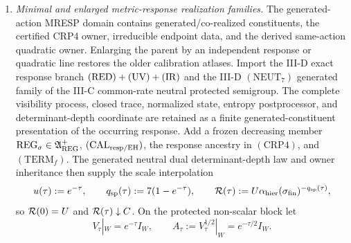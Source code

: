 \documentclass[12pt,a4paper]{article}
\begin{document}
\begin{definition}
\begin{enumerate}[label=(\roman*)]
\item \emph{Minimal and enlarged metric-response realization families.}
The generated-action MRESP domain contains generated/co-realized constituents,
the certified CRP4 owner, irreducible endpoint data, and the derived
same-action quadratic owner.  Enlarging the parent by an independent
response or quadratic line restores the older calibration atlases.
Import the III-D exact response branch
\((\mathrm{RED})+({\rm UV})+({\rm IR})\) and the III-D \((\mathrm{NEUT}_7)\)
generated family of the III-C common-rate neutral protected semigroup.  The
complete visibility process, closed trace, normalized state, entropy
postprocessor, and determinant-depth coordinate are retained as a finite
generated-constituent presentation of the occurring response.  Add a frozen
decreasing member
\(\mathrm{REG}_{\sigma}\in\mathfrak A_{\rm REG}^{+}\),
\((\mathrm{CAL}_{\rm resp/EH})\), the response ancestry in
\((\mathrm{CRP4})\), and \((\mathrm{TERM}_f)\).
The generated neutral dual determinant-depth law and owner inheritance then
supply the scale interpolation
\[
 u(\tau):=e^{-\tau},\qquad
 q_{\rm sp}(\tau):=7(1-e^{-\tau}),\qquad
 \mathcal R(\tau):=
 U\alpha_{\rm hier}(\sigma_{\rm fin})^{-q_{\rm sp}(\tau)},
\]
so \(\mathcal R(0)=U\) and \(\mathcal R(\tau)\downarrow C\).  On the protected
non-scalar block let
\[
 V_\tau|_W=e^{-\tau}I_W,
 \qquad A_\tau:=V_\tau^{1/2}|_W=e^{-\tau/2}I_W.
\]


\end{enumerate}
\end{definition}
\end{document}
